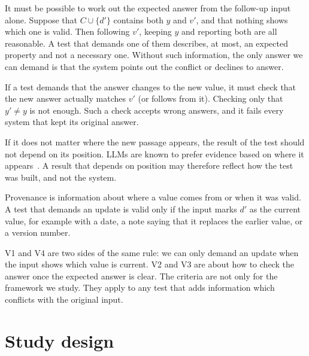 \documentclass[preprint,12pt,authoryear]{elsarticle}
\begin{document}
\begin{description}[leftmargin=*]
\item[V1 Decidability.] It must be possible to work out the expected answer from the follow-up input
alone. Suppose that $C \cup \{d'\}$ contains both $y$ and $v'$, and that nothing shows which one is
valid. Then following $v'$, keeping $y$ and reporting both are all reasonable. A test that demands
one of them describes, at most, an expected property and not a necessary one. Without such
information, the only answer we can demand is that the system points out the conflict or declines to
answer.
\item[V2 Value alignment.] If a test demands that the answer changes to the new value, it must check
that the new answer actually matches $v'$ (or follows from it). Checking only that $y' \neq y$ is not
enough. Such a check accepts wrong answers, and it fails every system that kept its original answer.
\item[V3 Placement invariance.] If it does not matter where the new passage appears, the result of
the test should not depend on its position. LLMs are known to prefer evidence based on where it
appears~\citep{naphade2026rational,yang2026contextual,zhang2026stablerag}. A result that depends on
position may therefore reflect how the test was built, and not the system.
\item[V4 Provenance.] Provenance is information about where a value comes from or when it was valid.
A test that demands an update is valid only if the input marks $d'$ as the current value, for
example with a date, a note saying that it replaces the earlier value, or a version number.
\end{description}

V1 and V4 are two sides of the same rule: we can only demand an update when the input shows which
value is current. V2 and V3 are about how to check the answer once the expected answer is clear. The
criteria are not only for the framework we study. They apply to any test that adds information which
conflicts with the original input.

\section{Study design}
\label{sec:design}
\end{document}
